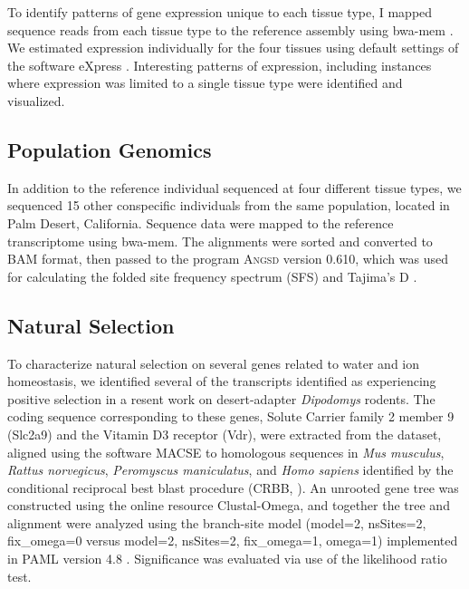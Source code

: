 \documentclass[11pt]{article}
\begin{document}
To identify patterns of gene expression unique to each tissue type, I mapped sequence reads from each tissue type to the reference assembly using bwa-mem \cite{Li:2013wn}. We estimated expression individually for the four tissues using default settings of the software eXpress \cite{Roberts:2012dh}. Interesting patterns of expression, including instances where expression was limited to a single tissue type were identified and visualized. \\ 

\subsection*{Population Genomics}

In addition to the reference individual sequenced at four different tissue types, we sequenced 15 other conspecific individuals from the same population, located in Palm Desert, California. Sequence data were mapped to the reference transcriptome using bwa-mem. The alignments were sorted and converted to BAM format, then passed to the program \textsc{Angsd} version 0.610, which was used for calculating the folded site frequency spectrum (SFS) and Tajima's D \cite{Korneliussen:2013uz}. \\


\subsection*{Natural Selection}

To characterize natural selection on several genes related to water and ion homeostasis, we identified several of the transcripts identified as experiencing positive selection in a resent work on desert-adapter \textit{Dipodomys} rodents. The coding sequence corresponding to these genes, Solute Carrier family 2 member 9  (Slc2a9) and the Vitamin D3 receptor (Vdr), were extracted from the dataset, aligned using the software MACSE \cite{Ranwez:2011kj} to homologous sequences in \textit{Mus musculus}, \textit{Rattus norvegicus}, \textit{Peromyscus maniculatus}, and \textit{Homo sapiens} identified by the conditional reciprocal best blast procedure (CRBB, \cite{Aubry:2014en}). An unrooted gene tree was constructed using the online resource Clustal-Omega, and together the tree and alignment were analyzed using the branch-site model (model=2, nsSites=2, fix\_omega=0 versus model=2, nsSites=2, fix\_omega=1, omega=1)  implemented in PAML version 4.8 \cite{Yang:2011bm,Yang:2007ki}. Significance was evaluated via use of the likelihood ratio test. \\   
\end{document}
